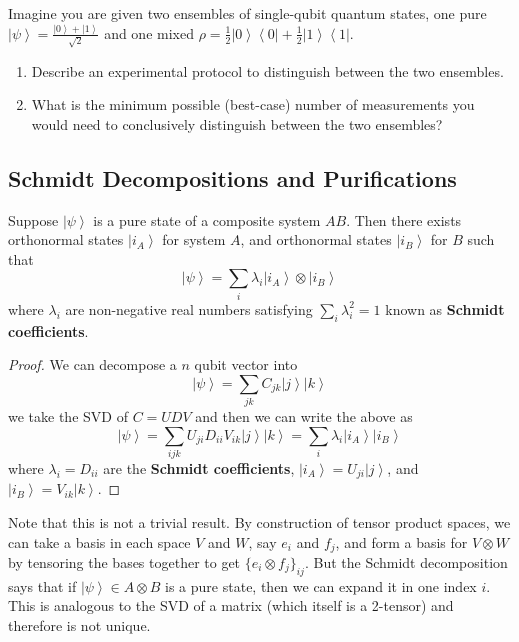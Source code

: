 \documentclass{article}
\newcommand{\ket}[1]{\ensuremath{\left|#1\right\rangle}}
\newcommand{\bra}[1]{\ensuremath{\left\langle#1\right|}}
\begin{document}
    \begin{exercise}
      Imagine you are given two ensembles of single-qubit quantum states, one pure $\ket{\psi} = \frac{\ket{0} + \ket{1}}{\sqrt{2}}$ and one mixed $\rho = \frac{1}{2} \ket{0} \bra{0} + \frac{1}{2} \ket{1} \bra{1}$. 
      \begin{enumerate}
        \item Describe an experimental protocol to distinguish between the two ensembles. 
        \item What is the minimum possible (best-case) number of measurements you would need to conclusively distinguish between the two ensembles? 
      \end{enumerate}
    \end{exercise}

  \subsection{Schmidt Decompositions and Purifications}

    \begin{theorem}
      Suppose $\ket{\psi}$ is a pure state of a composite system $AB$. Then there exists orthonormal states $\ket{i_A}$ for system $A$, and orthonormal states $\ket{i_B}$  for $B$ such that 
      \begin{equation}
        \ket{\psi} = \sum_i \lambda_i \ket{i_A} \otimes \ket{i_B}
      \end{equation}
      where $\lambda_i$ are non-negative real numbers satisfying $\sum_i \lambda_i^2 = 1$ known as \textbf{Schmidt coefficients}.
    \end{theorem}
    \begin{proof}
      We can decompose a $n$ qubit vector into 
      \begin{equation}
        \ket{\psi} = \sum_{j k} C_{j k} \ket{j} \ket{k} 
      \end{equation}
      we take the SVD of $C = U D V$ and then we can write the above as 
      \begin{equation}
        \ket{\psi} = \sum_{i j k} U_{ji} D_{ii} V_{ik} \ket{j} \ket{k} = \sum_i \lambda_i \ket{i_A} \ket{i_B} 
      \end{equation}
      where $\lambda_i = D_{ii}$ are the \textbf{Schmidt coefficients}, $\ket{i_A} = U_{j i} \ket{j}$, and $\ket{i_B} = V_{ik} \ket{k}$. 
    \end{proof}

    Note that this is not a trivial result. By construction of tensor product spaces, we can take a basis in each space $V$ and $W$, say $e_i$ and $f_j$, and form a basis for $V \otimes W$ by tensoring the bases together to get $\{e_i \otimes f_j\}_{ij}$. But the Schmidt decomposition says that if $\ket{\psi} \in A \otimes B$ is a pure state, then we can expand it in one index $i$. This is analogous to the SVD of a matrix (which itself is a 2-tensor) and therefore is not unique. 
\end{document}
